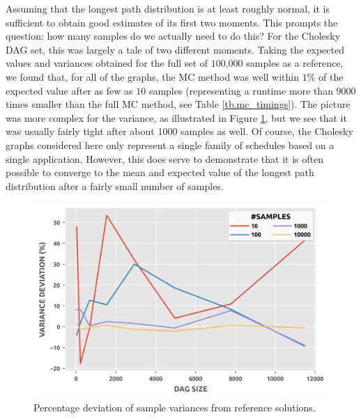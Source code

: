 \documentclass[12pt]{article}
\begin{document}
      Assuming that the longest path distribution is at least roughly normal, it is sufficient to obtain good estimates of its first two moments. This prompts the question: how many samples do we actually need to do this? For the Cholesky DAG set, this was largely a tale of two different moments. Taking the expected values and variances obtained for the full set of $100$,$000$ samples as a reference, we found that, for all of the graphs, the MC method was well within $1\%$ of the expected value after as few as $10$ samples (representing a runtime more than $9000$ times smaller than the full MC method, see Table \ref{tb.mc_timings}). The picture was more complex for the variance, as illustrated in Figure \ref{plot.mc_variance}, but we see that it was usually fairly tight after about 1000 samples as well. Of course, the Cholesky graphs considered here only represent a single family of schedules based on a single application. However, this does serve to demonstrate that it is often possible to converge to the mean and expected value of the longest path distribution after a fairly small number of samples.

      \begin{figure}
	\centering	
	\includegraphics[scale=1.0]{mc_variance.png}
	\caption{Percentage deviation of sample variances from reference solutions.}	
	\label{plot.mc_variance}
      \end{figure}
\end{document}
